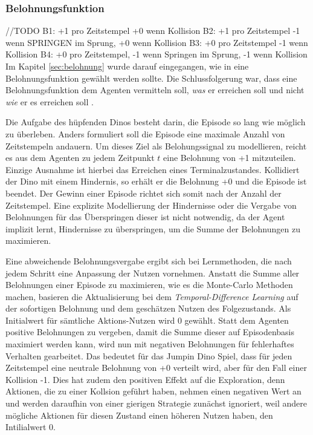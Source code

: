 \subsubsection{Belohnungsfunktion}
//TODO
B1: +1 pro Zeitstempel +0 wenn Kollision
B2: +1 pro Zeitstempel -1 wenn SPRINGEN im Sprung, +0 wenn Kollision
B3: +0 pro Zeitstempel -1 wenn Kollision
B4: +0 pro Zeitstempel, -1 wenn Springen im Sprung, -1 wenn Kollision
Im Kapitel \ref{sec:belohnung} wurde darauf eingegangen, wie in eine Belohnungsfunktion gewählt werden sollte. Die Schlussfolgerung war, dass eine Belohnungsfunktion dem Agenten vermitteln soll, \textit{was} er erreichen soll und nicht \textit{wie} er es erreichen soll \cite[S.~54]{Sutton1998}.
\par 
Die Aufgabe des hüpfenden Dinos besteht darin, die Episode so lang wie möglich zu überleben. Anders formuliert soll die Episode eine maximale Anzahl von Zeitstempeln andauern. Um dieses Ziel als Belohungssignal zu modellieren, reicht es aus dem Agenten zu jedem Zeitpunkt $t$ eine Belohnung von +1 mitzuteilen. Einzige Ausnahme ist hierbei das Erreichen eines Terminalzustandes. Kollidiert der Dino mit einem Hindernis, so erhält er die Belohnung +0 und die Episode ist beendet. Der Gewinn einer Episode richtet sich somit nach der Anzahl der Zeitstempel. Eine explizite Modellierung der Hindernisse oder die Vergabe von Belohnungen für das Überspringen dieser ist nicht notwendig, da der Agent implizit lernt, Hindernisse zu überspringen, um die Summe der Belohnungen zu maximieren. 
\par 
Eine abweichende Belohnungsvergabe ergibt sich bei Lernmethoden, die nach jedem Schritt eine Anpassung der Nutzen vornehmen. Anstatt die Summe aller Belohnungen einer Episode zu maximieren, wie es die Monte-Carlo Methoden machen, basieren die Aktualisierung bei dem \textit{Temporal-Difference Learning} auf der sofortigen Belohnung und dem geschätzen Nutzen des Folgezustands. Als Initialwert für sämtliche Aktions-Nutzen wird 0 gewählt. Statt dem Agenten positive Belohnungen zu vergeben, damit die Summe dieser auf Episodenbasis maximiert werden kann, wird nun mit negativen Belohnungen für fehlerhaftes Verhalten gearbeitet. Das bedeutet für das Jumpin Dino Spiel, dass für jeden Zeitstempel eine neutrale Belohnung von +0 verteilt wird, aber für den Fall einer Kollision -1. Dies hat zudem den positiven Effekt auf die Exploration, denn Aktionen, die zu einer Kollsion geführt haben, nehmen einen negativen Wert an und werden daraufhin von einer gierigen Strategie zunächst ignoriert, weil andere mögliche Aktionen für diesen Zustand einen höheren Nutzen haben, den Intilialwert 0.
